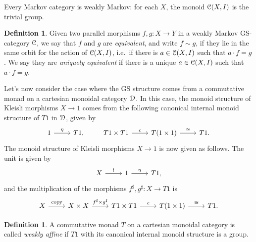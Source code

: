 \documentclass[a4paper,UKenglish,numberwithinsect,cleveref, autoref, thm-restate]{lipics-v2021}
\theoremstyle{plain} %
\theoremstyle{definition} %
\newtheorem{mydefinition}[mytheorem]{Definition}
\begin{document}
Every Markov category is weakly Markov: for each $X$, the monoid $\mathcal{C}(X,I)$ is the trivial group.

\begin{mydefinition}
 Given two parallel morphisms $f,g:X\to Y$ in a weakly Markov GS-category $\mathcal{C}$, we say that $f$ and $g$ are \emph{equivalent}, and write $f\sim g$, if they lie in the same orbit for the action of $\mathcal{C}(X,I)$, i.e.~if there is $a\in \mathcal{C}(X,I)$ such that $a\cdot f=g$.
 We say they are \emph{uniquely equivalent} if there is a unique $a\in \mathcal{C}(X,I)$ such that $a\cdot f=g$.
\end{mydefinition}


Let's now consider the case where the GS structure comes from a commutative monad on a cartesian monoidal category $\mathcal{D}$. 
In this case, the monoid structure of Kleisli morphisms $X\to 1$ comes from the following canonical internal monoid structure of $T1$ in $\mathcal{D}$, given by 
 \[
 \begin{tikzcd}
  1 \ar{r}{\eta} & T1 ,
 \end{tikzcd}
 \qquad
 \begin{tikzcd}
  T1 \times T1 \ar{r}{c} & T(1\times 1) \ar{r}{\cong} & T1 .
 \end{tikzcd}
 \]
 The monoid structure of Kleisli morphisms $X\to 1$ is now given as follows. The unit is given by
 \[
 \begin{tikzcd}
  X \ar{r}{!} & 1 \ar{r}{\eta} & T1 ,
 \end{tikzcd}
 \]
 and the multiplication of the morphisms $f^\sharp,g^\sharp:X\to T1$ is
 \[
 \begin{tikzcd}
  X \ar{r}{\mathrm{copy}} & X\times X \ar{r}{f^\sharp\times g^\sharp} &
  T1 \times T1 \ar{r}{c} & T(1\times 1) \ar{r}{\cong} & T1 .
 \end{tikzcd}
 \]
 

\begin{mydefinition}
 A commutative monad $T$ on a cartesian monoidal category is called \emph{weakly affine} if $T1$ with its canonical internal monoid structure is a group.
\end{mydefinition}
\end{document}
